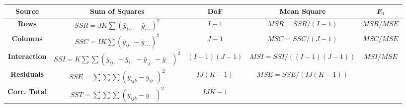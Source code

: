\documentclass[12pt]{article}
\begin{document}
\pagestyle{empty}
\large
{}
\pagecolor{ehandbook}


\hspace*{-1.75in}
\begin{tabular}{|c|c|c|c|c|} \hline 
{\bf Source}  & {\bf Sum of Squares} & {\bf DoF} & {\bf Mean Square} & {\bf \it{F}$_0$} \\ \hline
{\bf Rows}    & $SSR = JK\sum{{(\bar{y}_{i \cdot\cdot}-\bar{y}_{\cdot\cdot\cdot})}^2}$ & $I-1$ & $ MSR = SSR/(I-1)$  & $MSR/MSE$ \\ \hline
{\bf Columns} & $SSC = IK\sum{{(\bar{y}_{\cdot j \cdot} -\bar{y}_{\cdot\cdot\cdot} )}^2}$ & $J-1$ & $MSC = SSC / (J-1)$  & $MSC/MSE$ \\ \hline
{\bf Interaction} & $SSI = K\sum \sum{{(\bar{y}_{ij\cdot} - \bar{y}_{i\cdot\cdot} - \bar{y}_{\cdot j \cdot} - \bar{y}_{\cdot\cdot\cdot} )}}^2$ & $(I-1)(J-1)$ & $MSI = SSI / ((I-1)(J-1))$  & $MSI/MSE$ \\ \hline
{\bf Residuals} & $SSE = \sum \sum \sum{{(y_{ijk} - \bar{y}_{ij\cdot})^2}}$  & $IJ(K-1)$ & $ MSE = SSE / (IJ(K-1))$  & \\ \hline
{\bf Corr. Total} & $SST = \sum \sum \sum{{(y_{ijk} - \bar{y}_{\cdot\cdot\cdot})^2}} $ & $IJK-1$ & & \\ \hline
\end{tabular}

\vspace*{.5in} 
\end{document}
